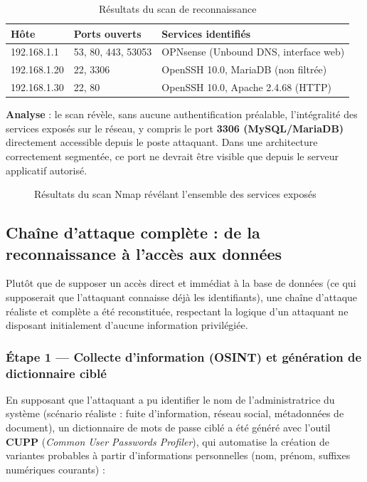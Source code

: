 \begin{table}[h]
\centering
\begin{tabular}{|l|l|l|}
\hline
\textbf{Hôte} & \textbf{Ports ouverts} & \textbf{Services identifiés} \\
\hline
192.168.1.1 & 53, 80, 443, 53053 & OPNsense (Unbound DNS, interface web) \\
192.168.1.20 & 22, 3306 & OpenSSH 10.0, MariaDB (non filtrée) \\
192.168.1.30 & 22, 80 & OpenSSH 10.0, Apache 2.4.68 (HTTP) \\
\hline
\end{tabular}
\caption{Résultats du scan de reconnaissance}
\label{tab:nmap-resultats}
\end{table}

\textbf{Analyse} : le scan révèle, sans aucune authentification préalable,
l'intégralité des services exposés sur le réseau, y compris le port
\textbf{3306 (MySQL/MariaDB)} directement accessible depuis le poste
attaquant. Dans une architecture correctement segmentée, ce port ne
devrait être visible que depuis le serveur applicatif autorisé.

\begin{figure}[h]
\centering
\caption{Résultats du scan Nmap révélant l'ensemble des services exposés}
\label{fig:nmap-scan}
\end{figure}

\subsection{Chaîne d'attaque complète : de la reconnaissance à l'accès aux données}
\label{sec:attaque-db}

Plutôt que de supposer un accès direct et immédiat à la base de données
(ce qui supposerait que l'attaquant connaisse déjà les identifiants),
une chaîne d'attaque réaliste et complète a été reconstituée, respectant
la logique d'un attaquant ne disposant initialement d'aucune information
privilégiée.

\subsubsection{Étape 1 --- Collecte d'information (OSINT) et génération de dictionnaire ciblé}

En supposant que l'attaquant a pu identifier le nom de l'administratrice
du système (scénario réaliste : fuite d'information, réseau social,
métadonnées de document), un dictionnaire de mots de passe ciblé a été
généré avec l'outil \textbf{CUPP} (\emph{Common User Passwords
Profiler}), qui automatise la création de variantes probables à partir
d'informations personnelles (nom, prénom, suffixes numériques
courants) :

